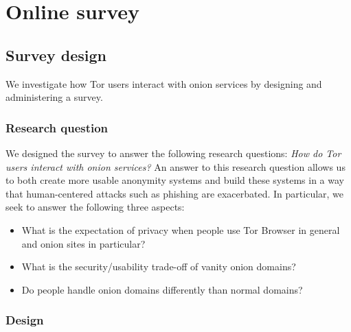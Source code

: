 \section{Online survey}
\label{sec:online-survey}

\subsection{Survey design}
\label{sec:survey-design}

We investigate how Tor users interact with onion services by designing and
administering a survey.

\subsubsection{Research question}
We designed the survey to answer the following research questions: \emph{How do
Tor users interact with onion services?}  An answer to this research question
allows us to both create more usable anonymity systems and build these systems
in a way that human-centered attacks such as phishing are exacerbated.  In
particular, we seek to answer the following three aspects:

\begin{itemize}
    \item What is the expectation of privacy when people use Tor Browser in
        general and onion sites in particular?
    \item What is the security/usability trade-off of vanity onion domains?
    \item Do people handle onion domains differently than normal domains?
\end{itemize}

\subsubsection{Design}

